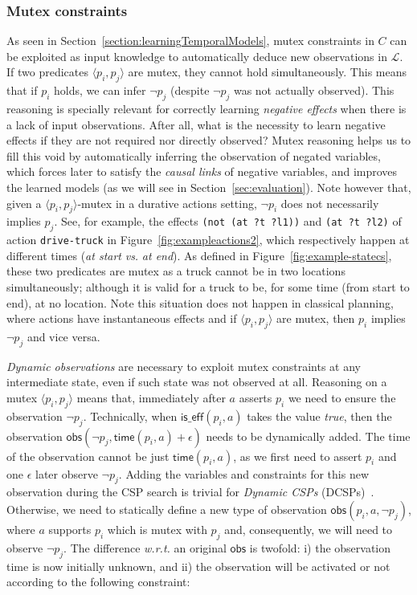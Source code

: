 \documentclass{ecai}
\newcommand{\tup}[1]{{\langle #1 \rangle}}
\newcommand{\iseff}{\mathsf{is\_eff}}    %
\newcommand{\obs}{\mathsf{obs}}    %
\newcommand{\tim}{\mathsf{time}}   %
\begin{document}
\subsubsection*{Mutex constraints}

As seen in Section~\ref{section:learningTemporalModels}, mutex constraints in $C$ can be exploited as input knowledge to automatically deduce new observations in $\mathcal{L}$.
If two predicates $\tup{p_i, p_j}$ are mutex, they cannot hold simultaneously. This means that if $p_i$ holds, we can infer $\neg p_j$ (despite $\neg p_j$ was not actually observed). 
This reasoning is specially relevant for correctly learning {\em negative effects} when there is a lack of input observations.
After all, what is the necessity to learn negative effects if they are not required nor directly observed?
Mutex reasoning helps us to fill this void by automatically inferring the observation of negated variables, which forces later to satisfy the {\em causal links} of negative variables, and improves the learned models (as we will see in Section~\ref{sec:evaluation}).
Note however that, given a $\tup{p_i, p_j}$-mutex in a durative actions setting, $\neg p_i$ does not necessarily implies $p_j$. 
See, for example, the effects \texttt{(not (at ?t ?l1))} and \texttt{(at ?t ?l2)} of action \texttt{drive-truck} in Figure~\ref{fig:exampleactions2}, which respectively happen at different times (\textit{at start} \textit{vs.} \textit{at end}).
As defined in Figure~\ref{fig:example-statecs}, these two predicates are mutex as a truck cannot be in two locations simultaneously; although 
it is valid for a truck to be, for some time (from start to end), at no location. Note this situation does not happen in classical planning, where actions have instantaneous effects and if $\tup{p_i, p_j}$ are mutex, then $p_i$ implies $\neg p_j$ and vice versa.

{\em Dynamic observations} are necessary to exploit mutex constraints at any intermediate state, even if such state was not observed at all. Reasoning on a mutex $\tup{p_i, p_j}$ means that, immediately after $a$ asserts $p_i$ we need to ensure the observation $\neg p_j$. 
Technically, when $\iseff(p_i,a)$ takes the value \textit{true}, then the observation $\obs(\neg p_j,\tim(p_i,a)+\epsilon)$
needs to be dynamically added. The time of the observation cannot be just $\tim(p_i,a)$, as we first need to assert $p_i$ and one $\epsilon$ later observe $\neg p_j$. Adding the variables and constraints for this new observation during the CSP search is trivial for {\em Dynamic CSPs} (DCSPs)~\cite{mittal1990dynamic}. Otherwise, we need to statically define a new type of observation $\obs(p_i,a,\neg p_j)$, where $a$ supports $p_i$ which is mutex with $p_j$ and, consequently, we will need to observe $\neg p_j$. The difference \textit{w.r.t.} an original $\obs$ is twofold: i) the observation time is now initially unknown, and ii) the observation will be activated or not according to the following constraint:
\newline
\end{document}
